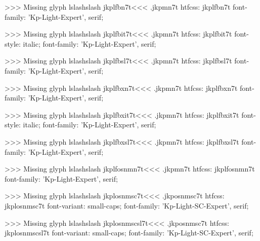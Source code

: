 >>>
Missing glyph	lslashslash
\<jkplfbn7t\><<<
.jkpmn7t
htfcss:  jkplfbn7t  font-family: 'Kp-Light-Expert', serif;

>>>
Missing glyph	lslashslash
\<jkplfbit7t\><<<
.jkpmn7t
htfcss:  jkplfbit7t  font-style: italic; font-family: 'Kp-Light-Expert', serif;

>>>
Missing glyph	lslashslash
\<jkplfbsl7t\><<<
.jkpmn7t
htfcss:  jkplfbsl7t  font-family: 'Kp-Light-Expert', serif;

>>>
Missing glyph	lslashslash
\<jkplfbxn7t\><<<
.jkpmn7t
htfcss:  jkplfbxn7t  font-family: 'Kp-Light-Expert', serif;

>>>
Missing glyph	lslashslash
\<jkplfbxit7t\><<<
.jkpmn7t
htfcss:  jkplfbxit7t  font-style: italic; font-family: 'Kp-Light-Expert', serif;

>>>
Missing glyph	lslashslash
\<jkplfbxsl7t\><<<
.jkpmn7t
htfcss:  jkplfbxsl7t  font-family: 'Kp-Light-Expert', serif;

>>>
Missing glyph	lslashslash
\<jkplfosnmn7t\><<<
.jkpmn7t
htfcss:  jkplfosnmn7t  font-family: 'Kp-Light-Expert', serif;

>>>
Missing glyph	lslashslash
\<jkplosnmsc7t\><<<
.jkposnmsc7t
htfcss:  jkplosnmsc7t  font-variant: small-caps; font-family: 'Kp-Light-SC-Expert', serif;

>>>
Missing glyph	lslashslash
\<jkplosnmscsl7t\><<<
.jkposnmsc7t
htfcss:  jkplosnmscsl7t  font-variant: small-caps; font-family: 'Kp-Light-SC-Expert', serif;

